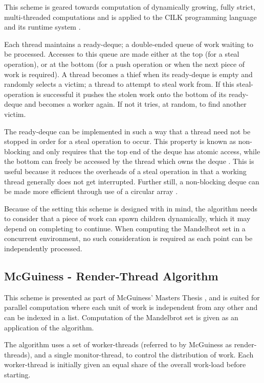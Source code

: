 This scheme is geared towards computation of dynamically growing, fully strict, multi-threaded computations and is applied to the CILK
programming language and its runtime system \cite{blumleis}. 

Each thread maintains a \gls{ready-deque}; a double-ended queue of work waiting to be processed. 
Accesses to this queue are made either at the top (for a steal operation), or at the bottom (for a push operation
or when the next piece of work is required).
A thread becomes a \gls{thief} when its ready-deque is empty and randomly selects a \gls{victim}; a thread
to attempt to steal work from. If this \gls{steal-operation} is successful it pushes the stolen work 
onto the bottom of its ready-deque and becomes a worker again. If not it tries, at random, to find another victim.

The ready-deque can be implemented in such a way that a thread need not be stopped in order for a steal operation 
to occur. This property is known as \gls{non-blocking} and only requires that the top end of the deque has atomic access,
while the bottom can freely be accessed by the thread which owns the deque \cite{narora}. This is useful because it reduces the overheads 
of a steal operation in that a working thread generally does not get interrupted. 
Further still, a non-blocking deque can be made more efficient through use of a \gls{circular array} \cite{circdeque}.

Because of the setting this scheme is designed with in mind, the algorithm needs to consider that
a piece of work can spawn children dynamically, which it may depend on completing to continue. 
When computing the Mandelbrot set in a concurrent environment, no such consideration is required 
as each point can be independently processed.

\subsection{McGuiness - Render-Thread Algorithm}
\label{sec:rendscheme}

This scheme is presented as part of McGuiness' Masters Thesis \cite{jmcguin}, and is suited for parallel computation where each unit of work is independent 
from any other and can be indexed in a list. Computation of the Mandelbrot set is given as an application of the algorithm. 

The algorithm uses a set of \glspl{worker-thread} (referred to by McGuiness as render-threads), 
and a single \gls{monitor-thread}, to control the distribution of work. Each \gls{worker-thread} is
initially given an equal share of the overall work-load before starting.

